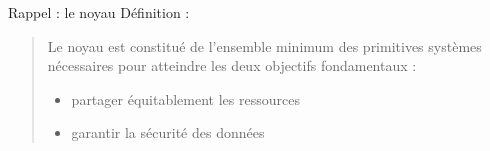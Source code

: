 \def\inc{inc2-1-intro}




\begin {frame} {Rappel : le noyau}
    Définition :

    \begin {quote}
	Le noyau est constitué de l'ensemble minimum des primitives
	systèmes nécessaires pour atteindre les deux objectifs
	fondamentaux :

	\begin {itemize}
	    \item partager équitablement les ressources
	    \item garantir la sécurité des données
	\end {itemize}

    \end {quote}
\end {frame}

